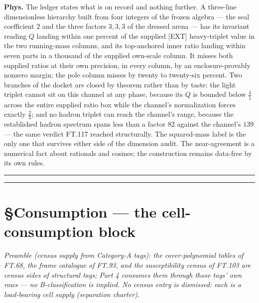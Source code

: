 \begin{theorem}
\textbf{Phys.} The ledger states what is on record and nothing further. A three-line dimensionless hierarchy built from four integers of the frozen algebra — the seal coefficient $2$ and the three factors $3,3,3$ of the dressed arena — has its invariant reading $Q$ landing within one percent of the supplied [EXT] heavy-triplet value in the two running-mass columns, and its top-anchored inner ratio landing within seven parts in a thousand of the supplied own-scale column. It misses both supplied ratios at their own precision, in every column, by an enclosure-provably nonzero margin; the pole column misses by twenty to twenty-six percent. Two branches of the docket are closed by theorem rather than by taste: the light triplet cannot sit on this channel at any phase, because its $Q$ is bounded below $\tfrac35$ across the entire supplied ratio box while the channel's normalization forces exactly $\tfrac23$; and no hadron triplet can reach the channel's range, because the established hadron spectrum spans less than a factor $82$ against the channel's $139$ — the same verdict FT.117 reached structurally. The squared-mass label is the only one that survives either side of the dimension audit. The near-agreement is a numerical fact about rationals and cosines; the construction remains data-free by its own rules.

\vspace{2pt}\noindent\rule{\textwidth}{0.4pt}\vspace{2pt}

\vspace{2pt}\noindent\rule{\textwidth}{0.4pt}\vspace{2pt}

\end{theorem}

\section[§Consumption — the cell-consumption block]{\texorpdfstring{§Consumption — the cell-consumption block}{SConsumption - the cell-consumption block}}

\textit{Preamble (census supply from Category-A tags): the cover-polynomial tables of FT.68, the frame catalogue of FT.93, and the susceptibility census of FT.103 are census sides of structural tags; Part 4 consumes them through those tags' own rows — no B-classification is implied. No census entry is dismissed: each is a load-bearing cell supply (separation charter).}


